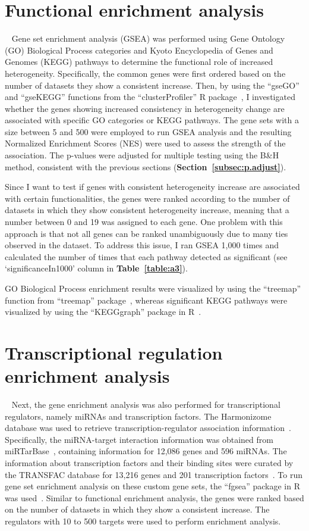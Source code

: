 \section{Functional enrichment analysis}~\label{sec:func}
Gene set enrichment analysis (GSEA) was performed using Gene Ontology (GO) Biological Process categories and Kyoto Encyclopedia of Genes and Genomes (KEGG) pathways 
to determine the functional role of increased heterogeneity.
Specifically, the common genes were first ordered based on the number of datasets they show a consistent increase.
Then, by using the ``gseGO'' and ``gseKEGG'' functions from the ``clusterProfiler'' R package~\cite{clusterProfiler}, 
I investigated whether the genes showing increased consistency in heterogeneity change are associated with specific GO categories or KEGG pathways.
The gene sets with a size between 5 and 500 were employed to run GSEA analysis and the resulting Normalized Enrichment Scores (NES) were used to assess the strength of the association.
The p-values were adjusted for multiple testing using the B{\&}H method, consistent with the previous sections (\textbf{Section~\ref{subsec:p.adjust}}).

Since I want to test if genes with consistent heterogeneity increase are associated with certain functionalities, 
the genes were ranked according to the number of datasets in which they show consistent heterogeneity increase, meaning that a number between 0 and 19 was assigned to each gene.
One problem with this approach is that not all genes can be ranked unambiguously due to many ties observed in the dataset. 
To address this issue, I ran GSEA 1,000 times and calculated the number of times that each pathway detected as significant (see `significanceIn1000' column in \textbf{Table~\ref{table:a3}}).

GO Biological Process enrichment results were visualized by using the ``treemap'' function from ``treemap'' package~\cite{treemap2021}, 
whereas significant KEGG pathways were visualized by using the ``KEGGgraph'' package in R~\cite{KEGGgraph}.

\section{Transcriptional regulation enrichment analysis}~\label{sec:reg.enrich}
Next, the gene enrichment analysis was also performed for transcriptional regulators, namely miRNAs and transcription factors. 
The Harmonizome database was used to retrieve transcription-regulator association information~\cite{Rouillard2016}.
Specifically, the miRNA-target interaction information was obtained from miRTarBase~\cite{Chou2016}, containing information for 12,086 genes and 596 miRNAs.
The information about transcription factors and their binding sites were curated by the TRANSFAC database for 13,216 genes and 201 transcription factors~\cite{Matys2006}.
To run gene set enrichment analysis on these custom gene sets, the ``fgsea'' package in R was used~\cite{fgsea}.
Similar to functional enrichment analysis, the genes were ranked based on the number of datasets in which they show a consistent increase.
The regulators with 10 to 500 targets were used to perform enrichment analysis.

